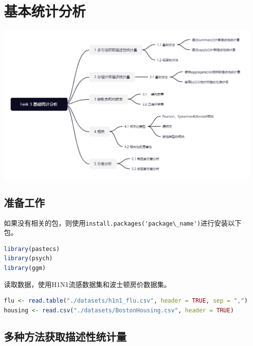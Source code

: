 \documentclass[]{ctexbook}
\newcommand{\passthrough}[1]{#1}
\begin{document}
\hypertarget{task-03}{%
\section{基本统计分析}\label{task-03}}

\includegraphics[width=1\textwidth,height=\textheight]{./image/task03_structure.png}

\hypertarget{ux51c6ux5907ux5de5ux4f5c-1}{%
\subsection*{准备工作}\label{ux51c6ux5907ux5de5ux4f5c-1}}


如果没有相关的包，则使用\passthrough{\lstinline!install.packages('package\_name')!}进行安装以下包。

\begin{lstlisting}[language=R]
library(pastecs)
library(psych)
library(ggm)
\end{lstlisting}

读取数据，使用H1N1流感数据集和波士顿房价数据集。

\begin{lstlisting}[language=R]
flu <- read.table("./datasets/h1n1_flu.csv", header = TRUE, sep = ",")
housing <- read.csv("./datasets/BostonHousing.csv", header = TRUE)
\end{lstlisting}

\hypertarget{ux591aux79cdux65b9ux6cd5ux83b7ux53d6ux63cfux8ff0ux6027ux7edfux8ba1ux91cf}{%
\subsection{多种方法获取描述性统计量}\label{ux591aux79cdux65b9ux6cd5ux83b7ux53d6ux63cfux8ff0ux6027ux7edfux8ba1ux91cf}}
\end{document}
